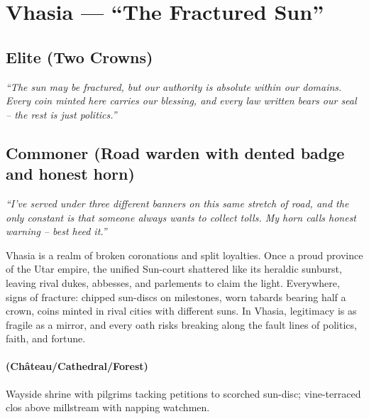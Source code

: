 \section{Vhasia --- ``The Fractured Sun''}
\label{chap:vhasia}

\subsection*{Elite (Two Crowns)}
\textit{``The sun may be fractured, but our authority is absolute within our domains. Every coin minted here carries our blessing, and every law written bears our seal – the rest is just politics.''}

\subsection*{Commoner (Road warden with dented badge and honest horn)}
\textit{``I've served under three different banners on this same stretch of road, and the only constant is that someone always wants to collect tolls. My horn calls honest warning – best heed it.''}

\begin{tcolorbox}[colback=black!3,colframe=black!40!white,title={Theme \& Atmosphere}]
Vhasia is a realm of broken coronations and split loyalties. Once a proud province of the Utar empire, the unified  Sun-court shattered like its heraldic sunburst, leaving rival dukes, abbesses, and parlements to claim the light. Everywhere, signs of fracture: chipped sun-discs on milestones, worn tabards bearing half a crown, coins minted in rival cities with different suns. In Vhasia,  legitimacy is as fragile as a mirror, and every oath risks breaking along the fault lines of politics, faith, and fortune.
\end{tcolorbox}

\paragraph*{(Château/Cathedral/Forest)} Wayside shrine with pilgrims tacking petitions to scorched sun-disc; vine-terraced clos above millstream with napping watchmen.

